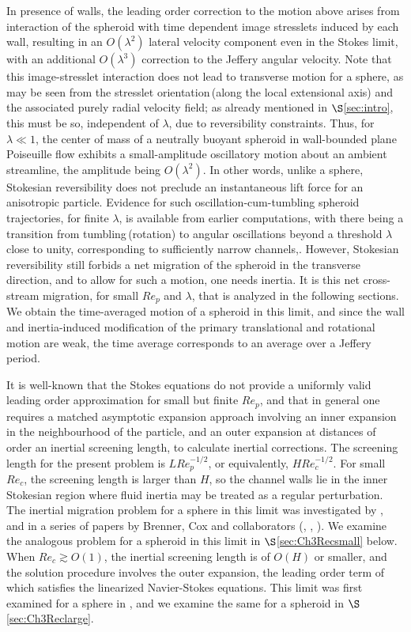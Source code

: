 \documentclass{jfm}
\begin{document}
In presence of walls, the leading order correction to the motion above arises from interaction of the spheroid with time dependent image stresslets induced by each wall, resulting in an $O(\lambda^2)$ lateral velocity component even in the Stokes limit, with an additional $O(\lambda^3)$ correction to the Jeffery angular velocity. Note that this image-stresslet interaction does not lead to transverse motion for a sphere, as may be seen from the stresslet orientation\,(along the local extensional axis) and the associated purely radial velocity field; as already mentioned in $\S$\ref{sec:intro}, this must be so, independent of $\lambda$, due to reversibility constraints. Thus, for $\lambda\ll 1$, the center of mass of a neutrally buoyant spheroid in wall-bounded plane Poiseuille flow exhibits a small-amplitude oscillatory motion about an ambient streamline, the amplitude being $O(\lambda^2)$. In other words, unlike a sphere, Stokesian reversibility does not preclude an instantaneous lift force for an anisotropic particle. Evidence for such oscillation-cum-tumbling spheroid trajectories, for finite $\lambda$, is available from earlier computations, with there being a transition from tumbling\,(rotation) to angular oscillations beyond a threshold $\lambda$ close to unity, corresponding to sufficiently narrow channels,\citep{sugihara1993,sugihara1996,staben2003,staben2006}. However, Stokesian reversibility still forbids a net migration of the spheroid in the transverse direction, and to allow for such a motion, one needs inertia. It is this net cross-stream migration, for small $Re_p$ and $\lambda$, that is analyzed in the following sections. We obtain the time-averaged motion of a spheroid in this limit, and since the wall and inertia-induced modification of the  primary translational and rotational motion are weak, the time average corresponds to an average over a Jeffery period. 

It is well-known that the Stokes equations do not provide a uniformly valid leading order approximation for small but finite $Re_p$, and that in general one requires a matched asymptotic expansion approach \citep{proudman_pearson_1957} involving an inner expansion in the neighbourhood of the particle, and an outer expansion at distances of order an inertial screening length, to calculate inertial corrections. The screening length for the present problem is $L Re_p^{-1/2}$, or equivalently, $HRe_c^{-1/2}$. For small $Re_c$, the screening length is larger than $H$, so the channel walls lie in the inner Stokesian region where fluid inertia may be treated as a regular perturbation. The inertial migration problem for a sphere in this limit was investigated by \cite{holeal1974}, and in a series of papers by Brenner, Cox and collaborators (\cite{coxbrenner1968}, \cite{vasseur1976}, \cite{cox1977}). We examine the analogous problem for a spheroid in this limit in $\S$\ref{sec:Ch3Recsmall} below. When $Re_c\gtrsim O(1)$, the inertial screening length is of $O(H)$ or smaller, and the solution procedure involves the outer expansion, the leading order term of which satisfies the linearized Navier-Stokes equations. This limit was first examined for a sphere in \cite{schonberghinch1989}, and  we examine the same for a spheroid in $\S$\ref{sec:Ch3Reclarge}.
\end{document}

